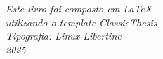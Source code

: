 \documentclass[11pt,a5paper,footinclude=true,headinclude=true,twoside,openright]{scrbook}
\begin{document}
\backmatter

\cleardoublepage
\thispagestyle{empty}
\vspace*{\fill}
\begin{center}
  \small
  \textit{Este livro foi composto em \LaTeX}\\
  \textit{utilizando o template ClassicThesis}\\[5mm]
  \textit{Tipografia: Linux Libertine}\\[5mm]
  \textit{2025}
\end{center}
\vfill
\end{document}
